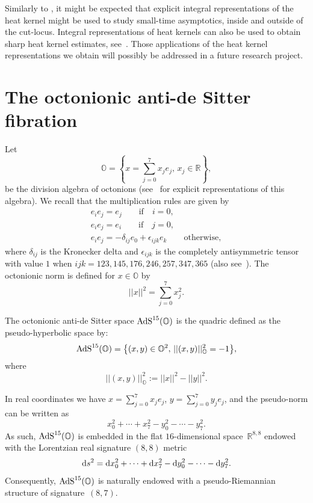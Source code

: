 \documentclass[10pt,a4paper]{amsart}
\numberwithin{equation}{section}
\begin{document}
Similarly to \cite{FBND18,FBJW18,JW16}, it might be expected that explicit integral representations of the heat kernel might be used to study small-time asymptotics, inside and outside of the cut-locus. Integral representations of heat kernels can also be used to obtain sharp heat kernel estimates, see~\cite{MR2541147}. Those applications of the heat kernel representations we obtain will possibly be addressed in a future research project.

\section{The octonionic anti-de Sitter fibration}\label{section2}

Let
\begin{equation*}
\mathbb{O}=\left\{x=\sum_{j=0}^{7}x_j e_j,\, x_j\in \mathbb{R} \right\},
\end{equation*}
be the division algebra of octonions (see~\cite{MR1803808} for explicit representations of this algebra). We recall that the multiplication rules are given by
\begin{gather*}
e_i e_j=e_j \qquad \text{if} \quad i=0,
\\
e_i e_j=e_i \qquad \text{if} \quad j=0,
\\
e_i e_j=-\delta_{ij}e_0+\epsilon_{ijk}e_k \qquad \text{otherwise},
\end{gather*}
where $\delta_{ij}$ is the Kronecker delta and $\epsilon_{ijk}$ is the completely antisymmetric tensor with value $1$ when $ijk = 123, 145, 176, 246, 257, 347, 365$ (also see~\cite{FBGC19}).
The octonionic norm is defined for $x \in \mathbb{O}$ by
\begin{equation*}
||x||^2=\sum_{j=0}^{7}x^2_j.
\end{equation*}

The octonionic anti-de Sitter space ${\rm AdS}^{15}(\mathbb{O})$ is the quadric defined as the pseudo-hyperbolic space by:
\begin{equation*}
{\rm AdS}^{15}(\mathbb{O})=\big\{(x,y)\in\mathbb{O}^2, \, ||(x,y)||^2_{\mathbb{O}}=-1 \big\},
\end{equation*}
where
\begin{equation*}
||(x,y)||^2_{\mathbb{O}}:=||x||^2-||y||^2.
\end{equation*}

In real coordinates we have $x=\sum_{j=0}^{7}x_j e_j$, $y=\sum_{j=0}^{7}y_j e_j$, and the pseudo-norm can be written as
\begin{equation*}
x_0^2+\cdots +x_7^2-y_0^2-\cdots-y_7^2.
\end{equation*}
As such, ${\rm AdS}^{15}(\mathbb{O})$ is embedded in the flat $16$-dimensional space~$\mathbb{R}^{8,8}$ endowed with the Lo\-rentzian real signature $(8,8)$ metric
\begin{equation*}
{\rm d}s^2={\rm d}x_0^2+\dots+{\rm d}x_7^2-{\rm d}y_0^2-\cdots-{\rm d}y_7^2.
\end{equation*}
Consequently, ${\rm AdS}^{15}(\mathbb{O})$ is naturally endowed with a pseudo-Riemannian structure of signature~$(8,7)$.
\end{document}
